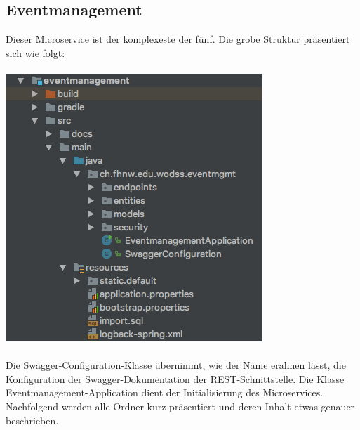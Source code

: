 \documentclass[11pt]{article} %
\begin{document}
\subsection{Eventmanagement}
Dieser Microservice ist der komplexeste der fünf. Die grobe Struktur präsentiert sich wie folgt:
\\
\\
\includegraphics[scale=0.7]{structure_eventmanagement}
\\
\\
Die Swagger-Configuration-Klasse übernimmt, wie der Name erahnen lässt, die Konfiguration der Swagger-Dokumentation der REST-Schnittstelle. Die Klasse Eventmanagement-Application dient der Initialisierung des Microservices. Nachfolgend werden alle Ordner kurz präsentiert und deren Inhalt etwas genauer beschrieben.
\\
\end{document}
